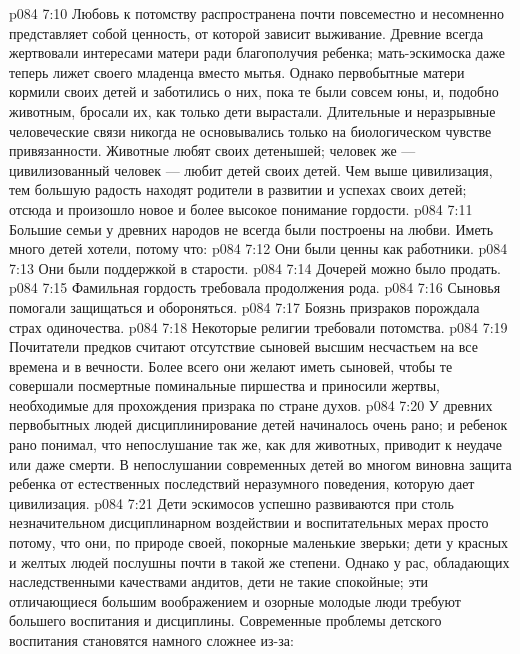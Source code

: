 \vs p084 7:10 \pc Любовь к потомству распространена почти повсеместно и несомненно представляет собой ценность, от которой зависит выживание. Древние всегда жертвовали интересами матери ради благополучия ребенка; мать\hyp{}эскимоска даже теперь лижет своего младенца вместо мытья. Однако первобытные матери кормили своих детей и заботились о них, пока те были совсем юны, и, подобно животным, бросали их, как только дети вырастали. Длительные и неразрывные человеческие связи никогда не основывались только на биологическом чувстве привязанности. Животные любят своих детенышей; человек же --- цивилизованный человек --- любит детей своих детей. Чем выше цивилизация, тем большую радость находят родители в развитии и успехах своих детей; отсюда и произошло новое и более высокое понимание  гордости.
\vs p084 7:11 Большие семьи у древних народов не всегда были построены на любви. Иметь много детей хотели, потому что:
\vs p084 7:12 \bibnobreakspace Они были ценны как работники.
\vs p084 7:13 \bibnobreakspace Они были поддержкой в старости.
\vs p084 7:14 \bibnobreakspace Дочерей можно было продать.
\vs p084 7:15 \bibnobreakspace Фамильная гордость требовала продолжения рода.
\vs p084 7:16 \bibnobreakspace Сыновья помогали защищаться и обороняться.
\vs p084 7:17 \bibnobreakspace Боязнь призраков порождала страх одиночества.
\vs p084 7:18 \bibnobreakspace Некоторые религии требовали потомства.
\vs p084 7:19 \pc Почитатели предков считают отсутствие сыновей высшим несчастьем на все времена и в вечности. Более всего они желают иметь сыновей, чтобы те совершали посмертные поминальные пиршества и приносили жертвы, необходимые для прохождения призрака по стране духов.
\vs p084 7:20 У древних первобытных людей дисциплинирование детей начиналось очень рано; и ребенок рано понимал, что непослушание так же, как для животных, приводит к неудаче или даже смерти. В непослушании современных детей во многом виновна защита ребенка от естественных последствий неразумного поведения, которую дает цивилизация.
\vs p084 7:21 Дети эскимосов успешно развиваются при столь незначительном дисциплинарном воздействии и воспитательных мерах просто потому, что они, по природе своей, покорные маленькие зверьки; дети у красных и желтых людей послушны почти в такой же степени. Однако у рас, обладающих наследственными качествами андитов, дети не такие спокойные; эти отличающиеся большим воображением и озорные молодые люди требуют большего воспитания и дисциплины. Современные проблемы детского воспитания становятся намного сложнее из\hyp{}за:
